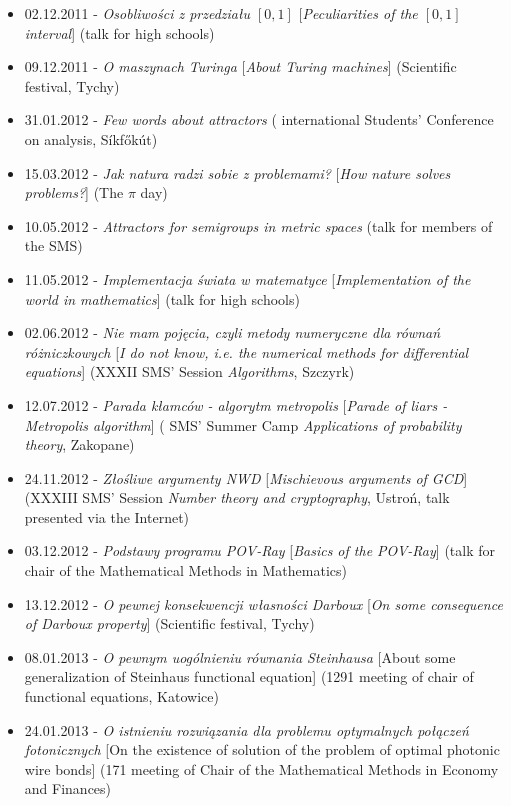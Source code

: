 \begin{itemize}
  \item 02.12.2011 - \textsl{Osobliwości z przedziału $[0, 1]$} [\textsl{Peculiarities of the $[0,1]$ interval}] (talk for high schools)
  \item 09.12.2011 - \textsl{O maszynach Turinga} [\textsl{About Turing machines}] (Scientific festival, Tychy)
  \item 31.01.2012 - \textsl{Few words about attractors} ( international Students' Conference on analysis, Síkfőkút)
  \item 15.03.2012 - \textsl{Jak natura radzi sobie z problemami?} [\textsl{How nature solves problems?}] (The $\pi$ day)
  \item 10.05.2012 - \textsl{Attractors for semigroups in metric spaces} (talk for members of the SMS)
  \item 11.05.2012 - \textsl{Implementacja świata w matematyce} [\textsl{Implementation of the world in mathematics}] (talk for high schools)
  \item 02.06.2012 - \textsl{Nie mam pojęcia, czyli metody numeryczne dla równań różniczkowych} [\textsl{I do not know, i.e. the numerical methods for differential equations}] (XXXII SMS' Session \textsl{Algorithms}, Szczyrk)
  \item 12.07.2012 - \textsl{Parada kłamców - algorytm metropolis} [\textsl{Parade of liars -  Metropolis algorithm}] ( SMS' Summer Camp \textsl{Applications of probability theory}, Zakopane)
  \item 24.11.2012 - \textsl{Złośliwe argumenty NWD} [\textsl{Mischievous arguments of GCD}] (XXXIII SMS' Session \textsl{Number theory and cryptography}, Ustroń, talk presented via the Internet)
  \item 03.12.2012 - \textsl{Podstawy programu POV-Ray} [\textsl{Basics of the POV-Ray}] (talk for chair of the Mathematical Methods in Mathematics)
  \item 13.12.2012 - \textsl{O pewnej konsekwencji własności Darboux} [\textsl{On some consequence of Darboux property}] (Scientific festival, Tychy)
  \item 08.01.2013 - \textsl{O pewnym uogólnieniu równania Steinhausa} [About some generalization of Steinhaus functional equation] (1291 meeting of chair of functional equations, Katowice)
  \item 24.01.2013 - \textsl{O istnieniu rozwiązania dla problemu optymalnych połączeń fotonicznych} [On the existence of solution of the problem of optimal photonic wire bonds] (171 meeting of Chair of the Mathematical Methods in Economy and Finances)

\end{itemize}
